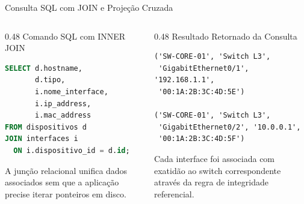 \begin{frame}[fragile]{Consulta SQL com JOIN e Projeção Cruzada}
  \vspace{-0.2cm}
  \begin{columns}[t]
    \begin{column}{0.48\textwidth}
      \alert{Comando SQL com INNER JOIN}\par
      \begin{lstlisting}[language=SQL,basicstyle=\ttfamily\scriptsize]
SELECT d.hostname, 
       d.tipo, 
       i.nome_interface, 
       i.ip_address, 
       i.mac_address
FROM dispositivos d
JOIN interfaces i 
  ON i.dispositivo_id = d.id;
      \end{lstlisting}
      \vspace{0.15cm}
      \footnotesize A junção relacional unifica dados associados sem que a aplicação precise iterar ponteiros em disco.
    \end{column}

    \begin{column}{0.48\textwidth}
      \alert{Resultado Retornado da Consulta}\par
      \begin{lstlisting}[basicstyle=\ttfamily\tiny]
('SW-CORE-01', 'Switch L3', 
 'GigabitEthernet0/1', '192.168.1.1', 
 '00:1A:2B:3C:4D:5E')

('SW-CORE-01', 'Switch L3', 
 'GigabitEthernet0/2', '10.0.0.1', 
 '00:1A:2B:3C:4D:5F')
      \end{lstlisting}
      \vspace{0.15cm}
      \footnotesize Cada interface foi associada com exatidão ao switch correspondente através da regra de integridade referencial.
    \end{column}
  \end{columns}
\end{frame}

